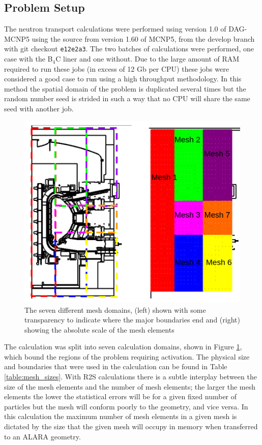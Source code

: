 \documentclass[12pt]{article}
\begin{document}
\subsection{Problem Setup}
The neutron transport calculations were performed using version 1.0 of DAG-MCNP5 using the source from version 1.60 of MCNP5, from the develop branch with git checkout \texttt{e12e2a3}. The two batches of calculations were performed, one case with the B$_4$C liner and one without. Due to the large amount of RAM required to run these jobs (in excess of 12 Gb per CPU) these jobs were considered a good case to run using a high throughput methodology. In this method the spatial domain of the problem is duplicated several times but the random number seed is strided in such a way that no CPU will share the same seed with another job.

\begin{figure}[ht!]
  \centering
  \includegraphics[scale=0.4]{../plots/transport/job_splits.png}
  \caption{The seven different mesh domains, (left) shown with some transparency to indicate where the major boundaries end and (right) showing the absolute
  scale of the mesh elements}
  \label{fig:mesh_domains}
\end{figure}

The calculation was split into seven calculation domains, shown in Figure \ref{fig:mesh_domains}, which bound the regions of the problem requiring activation. The physical size and boundaries that were used in the calculation can be found in Table \ref{table:mesh_sizes}. With R2S calculations there is a subtle interplay between the size of the mesh elements and the number of mesh elements; the larger the mesh elements the lower the statistical errors will be for a given fixed number of particles but the mesh will conform poorly to the geometry, and vice versa. In this calculation the maximum number of mesh elements in a given mesh is dictated by the size that the given mesh will occupy in memory when transferred to an ALARA geometry. 
\end{document}
